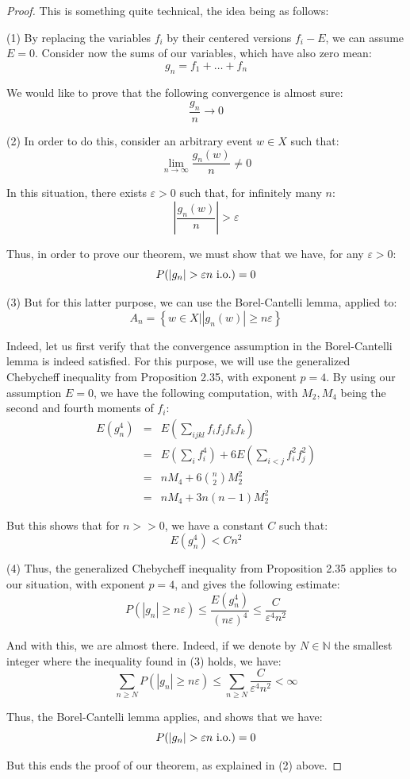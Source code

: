 \documentclass[12pt]{amsbook}
\begin{document}
\begin{proof}
This is something quite technical, the idea being as follows:

\medskip

(1) By replacing the variables $f_i$ by their centered versions $f_i-E$, we can assume $E=0$. Consider now the sums of our variables, which have also zero mean:
$$g_n=f_1+\ldots+f_n$$

We would like to prove that the following convergence is almost sure:
$$\frac{g_n}{n}\to0$$

(2) In order to do this, consider an arbitrary event $w\in X$ such that:
$$\lim_{n\to\infty}\frac{g_n(w)}{n}\neq0$$

In this situation, there exists $\varepsilon>0$ such that, for infinitely many $n$:
$$\left|\frac{g_n(w)}{n}\right|>\varepsilon$$

Thus, in order to prove our theorem, we must show that we have, for any $\varepsilon>0$:
$$P(|g_n|>\varepsilon n\ {\rm i.o.})=0$$

(3) But for this latter purpose, we can use the Borel-Cantelli lemma, applied to:
$$A_n=\left\{w\in X\Big||g_n(w)|\geq n\varepsilon\right\}$$

Indeed, let us first verify that the convergence assumption in the Borel-Cantelli lemma is indeed satisfied. For this purpose, we will use the generalized Chebycheff inequality from Proposition 2.35, with exponent $p=4$. By using our assumption $E=0$, we have the following computation, with $M_2,M_4$ being the second and fourth moments of $f_i$:
\begin{eqnarray*}
E(g_n^4)
&=&E\left(\sum_{ijkl}f_if_jf_kf_k\right)\\
&=&E\left(\sum_if_i^4\right)+6E\left(\sum_{i<j}f_i^2f_j^2\right)\\
&=&nM_4+6\binom{n}{2}M_2^2\\
&=&nM_4+3n(n-1)M_2^2
\end{eqnarray*}

But this shows that for $n>>0$, we have a constant $C$ such that:
$$E(g_n^4)<Cn^2$$

(4) Thus, the generalized Chebycheff inequality from Proposition 2.35 applies to our situation, with exponent $p=4$, and gives the following estimate:
$$P(|g_n|\geq n\varepsilon)\leq\frac{E(g_n^4)}{(n\varepsilon)^4}\leq\frac{C}{\varepsilon^4n^2}$$

And with this, we are almost there. Indeed, if we denote by $N\in\mathbb N$ the smallest integer where the inequality found in (3) holds, we have:
$$\sum_{n\geq N}P(|g_n|\geq n\varepsilon)\leq\sum_{n\geq N}\frac{C}{\varepsilon^4n^2}<\infty$$

Thus, the Borel-Cantelli lemma applies, and shows that we have:
$$P(|g_n|>\varepsilon n\ {\rm i.o.})=0$$

But this ends the proof of our theorem, as explained in (2) above.
\end{proof}
\end{document}
